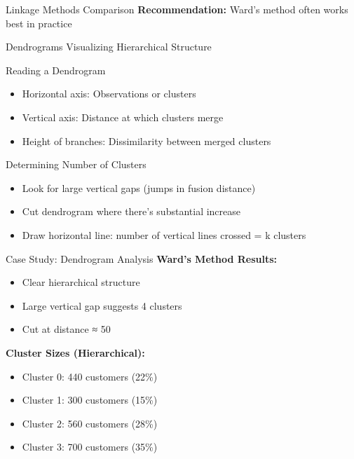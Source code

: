 \documentclass[aspectratio=169,ignorenonframetext]{beamer}
\begin{document}
\begin{frame}{Linkage Methods Comparison}
\textbf{Recommendation:} Ward's method often works best in practice
\end{frame}

\begin{frame}{Dendrograms}
Visualizing Hierarchical Structure
\end{frame}

\begin{frame}{Reading a Dendrogram}
\begin{itemize}
\item
  Horizontal axis: Observations or clusters
\item
  Vertical axis: Distance at which clusters merge
\item
  Height of branches: Dissimilarity between merged clusters
\end{itemize}
\end{frame}

\begin{frame}{Determining Number of Clusters}
\begin{itemize}
\item
  Look for large vertical gaps (jumps in fusion distance)
\item
  Cut dendrogram where there's substantial increase
\item
  Draw horizontal line: number of vertical lines crossed = k clusters
\end{itemize}
\end{frame}

\begin{frame}{Case Study: Dendrogram Analysis}
\textbf{Ward's Method Results:}

\begin{itemize}
\item
  Clear hierarchical structure
\item
  Large vertical gap suggests 4 clusters
\item
  Cut at distance ≈ 50
\end{itemize}

\textbf{Cluster Sizes (Hierarchical):}

\begin{itemize}
\item
  Cluster 0: 440 customers (22\%)
\item
  Cluster 1: 300 customers (15\%)
\item
  Cluster 2: 560 customers (28\%)
\item
  Cluster 3: 700 customers (35\%)
\end{itemize}
\end{frame}
\end{document}
